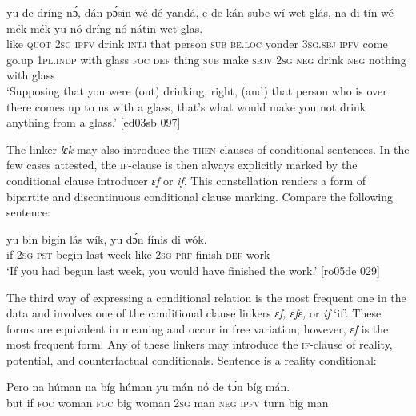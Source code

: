 \ea%
    \label{ex:key:1521}
    \gll {}      yu  de    dríng  nɔ́,  dán    pɔ́sin  wé   dé    yandá,  
e    de  kán    sube    wí    wet    glás,    na  di  tín  
wé    mék    mék    yu  nó  dríng  nó  nátin  wet    glas.\\
like  \textsc{quot}    \textsc{2sg}  \textsc{ipfv}    drink  \textsc{intj}  that    person  \textsc{sub}  \textsc{be.loc}  yonder
\textsc{3sg.sbj}  \textsc{ipfv}  come  go.up  \textsc{1pl.indp}  with    glass   \textsc{foc}  \textsc{def}  thing
\textsc{sub}    make  \textsc{sbjv}    \textsc{2sg}  \textsc{neg}  drink   \textsc{neg}  nothing  with    glass\\

\glt ‘Supposing that you were (out) drinking, right, (and) that person who
is over there comes up to us with a glass, that’s what would make you
not drink anything from a glass.’ [ed03sb 097]
\z

The linker \textit{lɛk} may also introduce the \textsc{then-}clauses of conditional sentences. In the few cases attested, the \textsc{if-}clause is then always explicitly marked by the conditional clause introducer \textit{ɛf} or \textit{if}.\textit{} This constellation renders a form of bipartite and discontinuous conditional clause marking. Compare the following sentence:


\ea%
    \label{ex:key:1522}
    \gll {}  yu  bin  bigín  lás  wík,      yu  dɔ́n  fínis    di  wók.\\
if  \textsc{2sg}  \textsc{pst}  begin  last  week  like  \textsc{2sg}  \textsc{prf}  finish  \textsc{def}  work\\

\glt ‘If you had begun last week, you would have finished the work.’ [ro05de 029]
\z

The third way of expressing a conditional relation is the most frequent one in the data and involves one of the conditional clause linkers \textit{ɛf, ɛfɛ}\textit{,} or\textit{ if} ‘if’. These forms are equivalent in meaning and occur in free variation; however, \textit{ɛf} is the most frequent form. Any of these linkers may introduce the \textsc{if-}clause of reality, potential, and counterfactual conditionals. Sentence  is a reality conditional: 


\ea%
    \label{ex:key:1523}
    \gll Pero      na  húman  na  bíg  húman  yu  mán  
nó  de  tɔ́n  bíg  mán.\\
but    if  \textsc{foc}  woman  \textsc{foc}  big  woman  \textsc{2sg}  man  
\textsc{neg}  \textsc{ipfv}  turn  big  man\\


